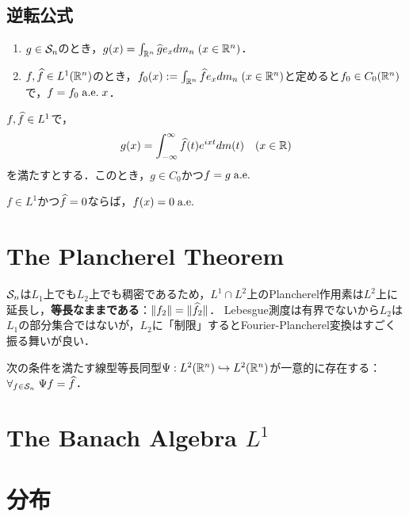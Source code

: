 \documentclass[uplatex,dvipdfmx]{jsreport}
\begin{document}
\subsection{逆転公式}

\begin{theorem}\mbox{}
    \begin{enumerate}
        \item $g\in\S_n$のとき，$g(x)=\int_{\R^n}\wh{g}e_xdm_n\;(x\in\R^n)$．
        \item $f,\wh{f}\in L^1(\R^n)$のとき，$f_0(x):=\int_{\R^n}\wh{f}e_xdm_n\;(x\in\R^n)$と定めると$f_0\in C_0(\R^n)$で，$f=f_0\;\ae x$．
    \end{enumerate}
    $f,\wh{f}\in L^1$で，
    \[g(x)=\int^\infty_{-\infty}\wh{f}(t)e^{ixt}dm(t)\quad(x\in\R)\]
    を満たすとする．このとき，$g\in C_0$かつ$f=g\;\ae$
\end{theorem}

\begin{theorem}
    $f\in L^1$かつ$\wh{f}=0$ならば，$f(x)=0\;\ae$
\end{theorem}

\section{The Plancherel Theorem}

\begin{tcolorbox}[colframe=ForestGreen, colback=ForestGreen!10!white,breakable,colbacktitle=ForestGreen!40!white,coltitle=black,fonttitle=\bfseries\sffamily,
title=$L^1$に入る前に，$L^2$上での完成された議論を見る]
    $\S_n$は$L_1$上でも$L_2$上でも稠密であるため，$L^1\cap L^2$上のPlancherel作用素は$L^2$上に延長し，\textbf{等長なままである}：$\norm{f_2}=\norm{\wh{f}_2}$．
    Lebesgue測度は有界でないから$L_2$は$L_1$の部分集合ではないが，$L_2$に「制限」するとFourier-Plancherel変換はすごく振る舞いが良い．
\end{tcolorbox}

\begin{theorem}
    次の条件を満たす線型等長同型$\Psi:L^2(\R^n)\mono L^2(\R^n)$が一意的に存在する：$\forall_{f\in\S_n}\;\Psi f=\wh{f}$．
\end{theorem}

\section{The Banach Algebra $L^1$}

\section{分布}
\end{document}

